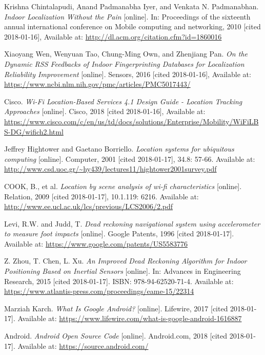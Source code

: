 \begin{thebibliography}{10}
Krishna Chintalapudi, Anand Padmanabha Iyer, and Venkata N. Padmanabhan. \textit{Indoor Localization Without the Pain} [online]. In: Proceedings of the sixteenth annual international conference on Mobile computing and networking, 2010 [cited 2018-01-16], Available at: \url{http://dl.acm.org/citation.cfm?id=1860016}

Xiaoyang Wen, Wenyuan Tao, Chung-Ming Own, and Zhenjiang Pan. \textit{On the Dynamic RSS Feedbacks of Indoor Fingerprinting Databases for Localization Reliability Improvement} [online]. Sensors, 2016 [cited 2018-01-16], Available at: \url{https://www.ncbi.nlm.nih.gov/pmc/articles/PMC5017443/}

Cisco. \textit{Wi-Fi Location-Based Services 4.1 Design Guide - Location Tracking Approaches} [online]. Cisco, 2018 [cited 2018-01-16], Available at: \url{https://www.cisco.com/c/en/us/td/docs/solutions/Enterprise/Mobility/WiFiLBS-DG/wifich2.html}

Jeffrey Hightower and Gaetano Borriello. \textit{Location systems for ubiquitous computing} [online]. Computer, 2001 [cited 2018-01-17], 34.8: 57-66. Available at: \url{http://www.csd.uoc.gr/~hy439/lectures11/hightower2001survey.pdf}

COOK, B., et al. \textit{Location by scene analysis of wi-fi characteristics} [online]. Relation, 2009 [cited 2018-01-17], 10.1.119: 6216. Available at: \url{http://www.ee.ucl.ac.uk/lcs/previous/LCS2006/2.pdf}

Levi, R.W. and Judd, T. \textit{Dead reckoning navigational system using accelerometer to measure foot impacts} [online]. Google Patents, 1996 [cited 2018-01-17]. Available at: \url{https://www.google.com/patents/US5583776}

Z. Zhou, T. Chen, L. Xu. \textit{An Improved Dead Reckoning Algorithm for Indoor Positioning Based on Inertial Sensors} [online]. In: Advances in Engineering Research, 2015 [cited 2018-01-17]. ISBN: 978-94-62520-71-4. Available at: \url{https://www.atlantis-press.com/proceedings/eame-15/22314}

Marziah Karch. \textit{What Is Google Android?} [online]. Lifewire, 2017 [cited 2018-01-17]. Available at: \url{https://www.lifewire.com/what-is-google-android-1616887}

Android. \textit{Android Open Source Code} [online]. Android.com, 2018 [cited 2018-01-17]. Available at: \url{https://source.android.com/}


\end{thebibliography}

